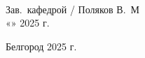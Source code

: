 \vfill         %

\begin{center}
\\[2em]
Зав.\ кафедрой \underline{\hspace{4cm}} / Поляков В.\ М\\[2em]
«\underline{\hspace{1cm}}» \underline{\hspace{4cm}} 2025 г.
\end{center}

\vspace{4em}

\begin{center}
Белгород 2025 г.
\end{center}
